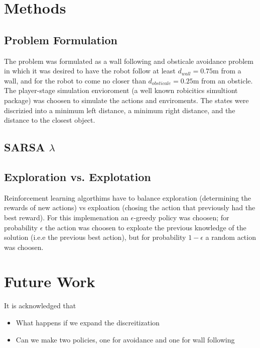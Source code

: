 \documentclass[conference]{IEEEtran}
\begin{document}
\section{Methods}
\subsection{Problem Formulation}
The problem was formulated as a wall following and obsticale avoidance problem in which it was desired to have the robot follow at least $d_{wall} = 0.75 \text{m}$ from a wall, and for the robot to come no closer than $d_{obsticale} = 0.25 \text{m}$ from an obsticle.
The player-stage simulation envioroment (a well known robicitics simultiont package) was choosen to simulate the actions and enviroments.  The states were discrizied into a minimum left distance, a minimum right distance, and the distance to the closest object.
\subsection{SARSA $\lambda$}

\subsection{Exploration vs. Explotation}
Reinforcement learning algorthims have to balance exploration (determining the rewards of new actions) vs exploation (chosing the action that previously had the best reward). For this implemenation an $\epsilon$-greedy policy was choosen; for probability $\epsilon$ the action was choosen to exploate the previous knowledge of the solution (i.e.e the previous best action), but for probability $1-\epsilon$ a random action was choosen.
\section{Future Work}
It is acknowledged that
\begin{itemize}
	\item What happens if we expand the discreitization
	\item Can we make two policies, one for avoidance and one for wall following
\end{itemize}


%
%
\end{document}
